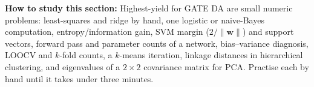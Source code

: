\documentclass[11pt,a4paper]{article}
\newcommand{\bw}{\boldsymbol{w}}
\newcommand{\norm}[1]{\lVert #1\rVert}
\begin{document}
\textbf{How to study this section:} Highest-yield for GATE DA are small numeric problems: least-squares and ridge by hand, one logistic or naive-Bayes computation, entropy/information gain, SVM margin ($2/\norm{\bw}$) and support vectors, forward pass and parameter counts of a network, bias--variance diagnosis, LOOCV and $k$-fold counts, a $k$-means iteration, linkage distances in hierarchical clustering, and eigenvalues of a $2\times2$ covariance matrix for PCA. Practise each by hand until it takes under three minutes.
\end{document}
